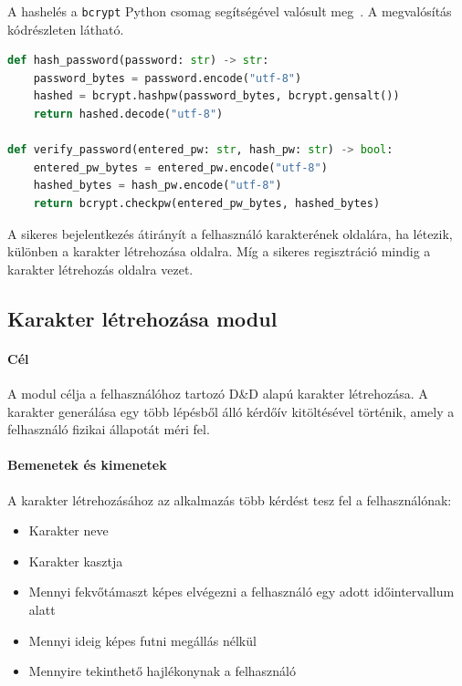 \documentclass[
]{thesis-ekf}
\theoremstyle{definition}
\theoremstyle{remark}
\begin{document}
A hashelés a \texttt{bcrypt} Python csomag segítségével valósult meg~\cite{bcrypt}. A megvalósítás  kódrészleten látható.

\begin{lstlisting}[language=Python, style=pythonstyle, caption={Jelszó hash-elése és ellenőrzése}, label={code_gen_hash}]
def hash_password(password: str) -> str:
    password_bytes = password.encode("utf-8")
    hashed = bcrypt.hashpw(password_bytes, bcrypt.gensalt())
    return hashed.decode("utf-8")

def verify_password(entered_pw: str, hash_pw: str) -> bool:
    entered_pw_bytes = entered_pw.encode("utf-8")
    hashed_bytes = hash_pw.encode("utf-8")
    return bcrypt.checkpw(entered_pw_bytes, hashed_bytes)
\end{lstlisting}

A sikeres bejelentkezés átirányít a felhasználó karakterének oldalára, ha létezik, különben a karakter létrehozása oldalra. Míg a sikeres regisztráció mindig a karakter létrehozás oldalra vezet.

\subsection{Karakter létrehozása modul}

\paragraph{Cél}
A modul célja a felhasználóhoz tartozó D\&D alapú karakter létrehozása. A karakter generálása egy több lépésből álló kérdőív kitöltésével történik, amely a felhasználó fizikai állapotát méri fel.

\paragraph{Bemenetek és kimenetek}
A karakter létrehozásához az alkalmazás több kérdést tesz fel a felhasználónak:

\begin{itemize}
    \item Karakter neve
    \item Karakter kasztja
    \item Mennyi fekvőtámaszt képes elvégezni a felhasználó egy adott időintervallum alatt
    \item Mennyi ideig képes futni megállás nélkül
    \item Mennyire tekinthető hajlékonynak a felhasználó
\end{itemize}
\end{document}
